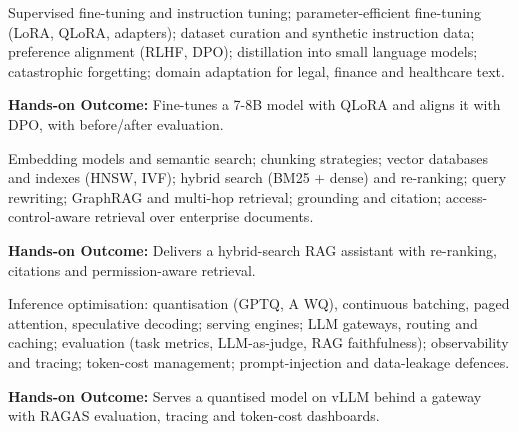\documentclass[10pt,a4paper]{article}
\begin{document}
\begin{tcolorbox}[unitbox,title={{\color{gold}UNIT III}\quad Fine-Tuning and Alignment\hfill{\color{gold}9 Hours}}]\small Supervised fine-tuning and instruction tuning; parameter-eﬀicient fine-tuning (LoRA, QLoRA, adapters); dataset curation and synthetic instruction data; preference alignment (RLHF, DPO); distillation into small language models; catastrophic forgetting; domain adaptation for legal, finance and healthcare text.\par\vspace{2pt}\par\textbf{Hands-on Outcome:} Fine-tunes a 7-8B model with QLoRA and aligns it with DPO, with before/after evaluation.\end{tcolorbox}
\begin{tcolorbox}[unitbox,title={{\color{gold}UNIT IV}\quad Retrieval-Augmented Generation\hfill{\color{gold}9 Hours}}]\small Embedding models and semantic search; chunking strategies; vector databases and indexes (HNSW, IVF); hybrid search (BM25 + dense) and re-ranking; query rewriting; GraphRAG and multi-hop retrieval; grounding and citation; access-control-aware retrieval over enterprise documents.\par\vspace{2pt}\par\textbf{Hands-on Outcome:} Delivers a hybrid-search RAG assistant with re-ranking, citations and permission-aware retrieval.\end{tcolorbox}
\begin{tcolorbox}[unitbox,title={{\color{gold}UNIT V}\quad LLMOps, Evaluation and Production Serving\hfill{\color{gold}9 Hours}}]\small Inference optimisation: quantisation (GPTQ, A WQ), continuous batching, paged attention, speculative decoding; serving engines; LLM gateways, routing and caching; evaluation (task metrics, LLM-as-judge, RAG faithfulness); observability and tracing; token-cost management; prompt-injection and data-leakage defences.\par\vspace{2pt}\par\textbf{Hands-on Outcome:} Serves a quantised model on vLLM behind a gateway with RAGAS evaluation, tracing and token-cost dashboards.\end{tcolorbox}
\end{document}
